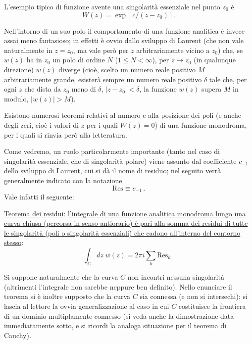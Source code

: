 \documentclass[11pt, a4paper]{book}
\numberwithin{equation}{section}
\begin{document}
L'esempio tipico di funzione avente una singolarità essenziale nel punto $z_0$ è
\begin{equation}
W(z) = \exp\!\left[c/(z - z_0)\right]. \tag{6}
\end{equation}

Nell'intorno di un suo polo il comportamento di una funzione analitica è invece assai meno fantasioso; in effetti è ovvio dallo sviluppo di Laurent (che non vale naturalmente in $z = z_0$, ma vale però per $z$ arbitrariamente vicino a $z_0$) che, se $w(z)$ ha in $z_0$ un polo di ordine $N$ ($1 \leq N < \infty$), per $z \to z_0$ (in qualunque direzione) $w(z)$ diverge (cioè, scelto un numero reale positivo $M$ arbitrariamente grande, esisterà sempre un numero reale positivo $\delta$ tale che, per ogni $z$ che dista da $z_0$ meno di $\delta$, $|z - z_0| < \delta$, la funzione $w(z)$ supera $M$ in modulo, $|w(z)| > M$).

Esistono numerosi teoremi relativi al numero e alla posizione dei poli (e anche degli zeri, cioè i valori di $z$ per i quali $W(z) = 0$) di una funzione monodroma, per i quali si rinvia però alla letteratura.

Come vedremo, un ruolo particolarmente importante (tanto nel caso di singolarità essenziale, che di singolarità polare) viene assunto dal coefficiente $c_{-1}$ dello sviluppo di Laurent, cui si dà il nome di \underline{residuo}; nel seguito verrà generalmente indicato con la notazione
\begin{equation}
\mathrm{Res} \equiv c_{-1}\,. \tag{7}
\end{equation}
Vale infatti il seguente:

\uline{Teorema dei residui}: \uline{l'integrale di una funzione analitica monodroma lungo una curva chiusa (percorsa in senso antiorario) è pari alla somma dei residui di tutte le singolarità (poli o singolarità essenziali) che cadono all'interno del contorno stesso}:
\begin{equation}
\int_C dz\; w(z) = 2\pi i \sum_k \mathrm{Res}_k\,. \tag{8}
\end{equation}

Si suppone naturalmente che la curva $C$ non incontri nessuna singolarità (altrimenti l'integrale non sarebbe neppure ben definito). Nello enunciare il teorema si è inoltre supposto che la curva $C$ sia connessa (e non si intersechi); si lascia al lettore la ovvia generalizzazione al caso in cui $C$ costituisce la frontiera di un dominio multiplamente connesso (si veda anche la dimostrazione data immediatamente sotto, e si ricordi la analoga situazione per il teorema di Cauchy).
\end{document}
